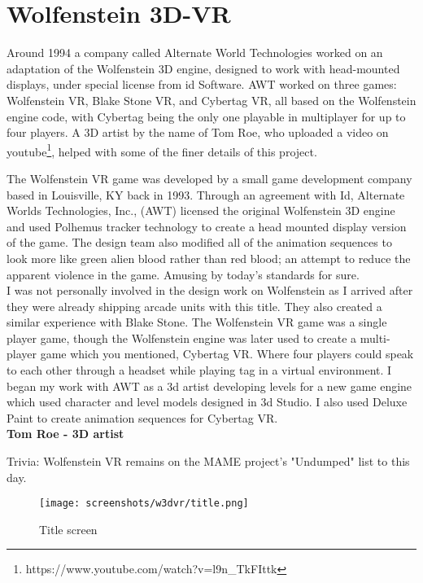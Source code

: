 \section{Wolfenstein 3D-VR}
Around 1994 a company called Alternate World Technologies worked on an adaptation of the Wolfenstein 3D engine, designed to work with head-mounted displays, under special license from id Software. AWT worked on three games: Wolfenstein VR, Blake Stone VR, and Cybertag VR, all based on the Wolfenstein engine code, with Cybertag being the only one playable in multiplayer for up to four players. A 3D artist by the name of Tom Roe, who uploaded a video on youtube\footnote{https://www.youtube.com/watch?v=l9n\_TkFIttk}, helped with some of the finer details of this project.\\

\begin{fancyquotes}
The Wolfenstein VR game was developed by a small game development company based in Louisville, KY back in 1993. Through an agreement with Id, Alternate Worlds Technologies, Inc., (AWT) licensed the original Wolfenstein 3D engine and used Polhemus tracker technology to create a head mounted display version of the game. The design team also modified all of the animation sequences to look more like green alien blood rather than red blood; an attempt to reduce the apparent violence in the game. Amusing by today's standards for sure.
 \bigskip \\
I was not personally involved in the design work on Wolfenstein as I arrived after they were already shipping arcade units with this title. They also created a similar experience with Blake Stone. The Wolfenstein VR game was a single player game, though the Wolfenstein engine was later used to create a multi-player game which you mentioned, Cybertag VR. Where four players could speak to each other through a headset while playing tag in a virtual environment. I began my work with AWT as a 3d artist developing levels for a new game engine which used character and level models designed in 3d Studio. I also used Deluxe Paint to create animation sequences for Cybertag VR.
 \bigskip \\
\textbf{Tom Roe - 3D artist}
 \end{fancyquotes}


Trivia: Wolfenstein VR remains on the MAME project's "Undumped" list to this day.

\begin{figure}[H]
  \centering
 \texttt{[image: screenshots/w3dvr/title.png]}
 \caption{Title screen}
\end{figure}


